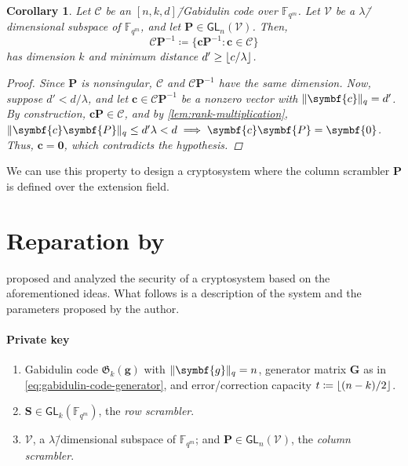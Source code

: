 \documentclass[version=last, paper=A4, parskip=half, oneside]{scrbook}
\theoremstyle{plain}
\newtheorem{corollary}{Corollary}
\theoremstyle{definition}
\theoremstyle{remark}
\renewcommand*{\vec}{\symbf}
\newcommand*{\mat}{\symbf}
\newcommand*{\GL}{\ensuremath{\mathsf{GL}}}
\newcommand*{\FF}{\ensuremath{\mathbb{F}}}
\newcommand*{\Gab}{\ensuremath{\mathfrak{G}}}
\DeclarePairedDelimiter{\floor}{\lfloor}{\rfloor}
\DeclarePairedDelimiter{\norm}{\lVert}{\rVert}
\newcommand*{\normR}[2]{\ensuremath{\norm{#1}_{#2}}}
\begin{document}
\begin{corollary}
  Let \(\mathcal{C}\) be an \([n, k, d]\)\=/Gabidulin code over \(\FF_{q^m}\).
  Let \(\mathcal{V}\) be a \(\lambda\)\=/dimensional subspace of \(\FF_{q^m}\),
  and let \(\mat{P} \in \GL_n(\mathcal{V})\).  Then,
  \[
    \mathcal{C} \mat{P}^{-1} \coloneqq \{\vec{c} \mat{P}^{-1} : \vec{c} \in \mathcal{C}\}
  \]
  has dimension \(k\) and minimum distance \(d' \ge \floor{c / {\lambda}}\).
  \begin{proof}
    Since \(\mat{P}\) is nonsingular, \(\mathcal{C}\) and
    \(\mathcal{C} \mat{P}^{-1}\) have the same dimension.  Now, suppose
    \(d' < d / {\lambda}\), and let \(\vec{c} \in \mathcal{C} \mat{P}^{-1}\) be
    a nonzero vector with \(\normR{\vec{c}}{q} = d'\).  By construction,
    \(\vec{c} \vec{P} \in \mathcal{C}\), and by \cref{lem:rank-multiplication},
    \(\normR{\vec{c} \mat{P}}{q} \le d' \lambda < d \implies \vec{c} \mat{P} = \vec{0}\).
    Thus, \(\vec{c} = \vec{0}\), which contradicts the hypothesis.
  \end{proof}
\end{corollary}

We can use this property to design a cryptosystem where the column scrambler
\(\mat{P}\) is defined over the extension field.

\section{Reparation by \texorpdfstring{\textcite{Loi17}}{Loidreau}}

\Textcite{Loi17} proposed and analyzed the security of a cryptosystem based on
the aforementioned ideas.  What follows is a description of the system and the
parameters proposed by the author.

\paragraph{Private key}
\begin{enumerate}
\item Gabidulin code \(\Gab_k(\vec{g})\) with \(\normR{\vec{g}}{q} = n\),
  generator matrix \(\mat{G}\) as in \cref{eq:gabidulin-code-generator}, and
  error\-/correction capacity \(t \coloneqq \floor{(n - k) / {2}}\).
\item \(\mat{S} \in \GL_k(\FF_{q^m})\), the \emph{row scrambler}.
\item \(\mathcal{V}\), a \(\lambda\)\=/dimensional subspace of \(\FF_{q^m}\);
  and \(\mat{P} \in \GL_n(\mathcal{V})\), the \emph{column scrambler}.
\end{enumerate}
\end{document}
